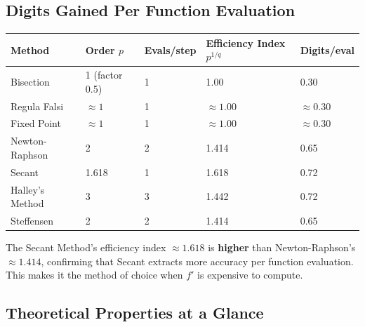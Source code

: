 \documentclass[12pt]{article}
\newcommand{\hcell}[1]{\textbf{\color{white}#1}}
\begin{document}
\bigskip

\subsection*{Digits Gained Per Function Evaluation}

\begin{center}{\small
\begin{tabular}{p{3.2cm} C{2cm} C{2cm} C{2.5cm} C{3cm}}
\toprule
{}
\hcell{Method} & \hcell{Order $p$} & \hcell{Evals/step} & \hcell{Efficiency Index $p^{1/q}$} & \hcell{Digits/eval} \\
\midrule
{}
Bisection & 1 (factor 0.5) & 1 & 1.00 & 0.30 \\
Regula Falsi & $\approx 1$ & 1 & $\approx 1.00$ & $\approx 0.30$ \\
Fixed Point & $\approx 1$ & 1 & $\approx 1.00$ & $\approx 0.30$ \\
Newton-Raphson & 2 & 2 & 1.414 & 0.65 \\
Secant & 1.618 & 1 & 1.618 & 0.72 \\
Halley's Method & 3 & 3 & 1.442 & 0.72 \\
Steffensen & 2 & 2 & 1.414 & 0.65 \\
\bottomrule
\end{tabular}
}\end{center}

\begin{keybox}
The Secant Method's efficiency index $\approx 1.618$ is \textbf{higher} than Newton-Raphson's $\approx 1.414$, confirming that Secant extracts more accuracy per function evaluation. This makes it the method of choice when $f'$ is expensive to compute.
\end{keybox}

\bigskip

\subsection*{Theoretical Properties at a Glance}
\end{document}

